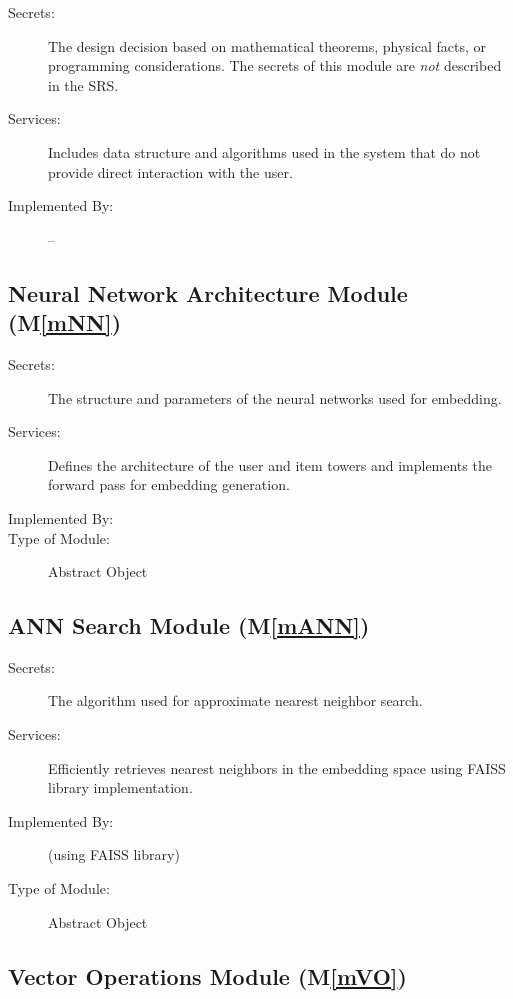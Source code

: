 \documentclass[12pt, titlepage]{article}
\newcommand{\mref}[1]{M\ref{#1}}
\begin{document}
\begin{description}
\item[Secrets:] The design decision based on mathematical theorems, physical
  facts, or programming considerations. The secrets of this module are
  \emph{not} described in the SRS.
\item[Services:] Includes data structure and algorithms used in the system that
  do not provide direct interaction with the user. 
\item[Implemented By:] --
\end{description}

\subsection{Neural Network Architecture Module (\mref{mNN})}

\begin{description}
\item[Secrets:]The structure and parameters of the neural networks used for embedding.
\item[Services:]Defines the architecture of the user and item towers and implements the forward pass for embedding generation.
\item[Implemented By:] \progname
\item[Type of Module:] Abstract Object
\end{description}

\subsection{ANN Search Module (\mref{mANN})}

\begin{description}
\item[Secrets:]The algorithm used for approximate nearest neighbor search.
\item[Services:]Efficiently retrieves nearest neighbors in the embedding space using FAISS library implementation.
\item[Implemented By:] \progname (using FAISS library)
\item[Type of Module:] Abstract Object
\end{description}

\subsection{Vector Operations Module (\mref{mVO})}
\end{document}
